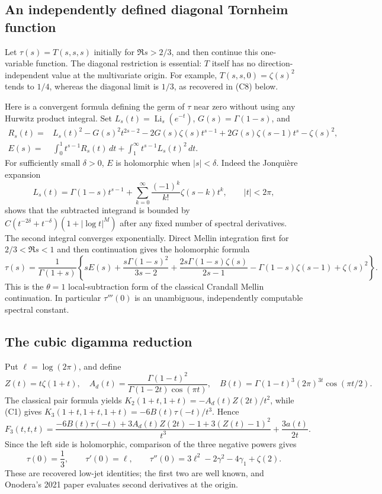 \subsection{An independently defined diagonal Tornheim function}

Let $\tau(s)=T(s,s,s)$ initially for $\Re s>2/3$, and then continue
this one-variable function.  The diagonal restriction is essential:
$T$ itself has no direction-independent value at the multivariate
origin. For example, $T(s,s,0)=\zeta(s)^2$ tends to $1/4$, whereas
the diagonal limit is $1/3$, as recovered in (C8) below.

Here is a convergent formula defining the germ of $\tau$ near zero
without using any Hurwitz product integral. Set
$L_s(t)=\operatorname{Li}_s(e^{-t})$, $G(s)=\Gamma(1-s)$, and
\begin{align*}
 R_s(t)={}&L_s(t)^2-G(s)^2t^{2s-2}
   -2G(s)\zeta(s)t^{s-1}
   +2G(s)\zeta(s-1)t^s-\zeta(s)^2,\\
 E(s)={}&\int_0^1t^{s-1}R_s(t)\,dt
          +\int_1^\infty t^{s-1}L_s(t)^2\,dt.
\end{align*}
For sufficiently small $\delta>0$, $E$ is holomorphic when $|s|<\delta$.
Indeed the Jonqui\`ere expansion \cite{DLMFPolylog}
\[
 L_s(t)=\Gamma(1-s)t^{s-1}
        +\sum_{k=0}^\infty\frac{(-1)^k}{k!}\zeta(s-k)t^k,
 \qquad |t|<2\pi,
\]
shows that the subtracted integrand is bounded by
$C(t^{-2\delta}+t^{-\delta})(1+|\log t|^M)$ after any fixed number
of spectral derivatives. The second integral converges exponentially.
Direct Mellin integration first for $2/3<\Re s<1$ and then continuation
gives the holomorphic formula
\[
 \tau(s)=\frac1{\Gamma(1+s)}\left\{
 sE(s)+\frac{s\Gamma(1-s)^2}{3s-2}
 +\frac{2s\Gamma(1-s)\zeta(s)}{2s-1}
 -\Gamma(1-s)\zeta(s-1)+\zeta(s)^2\right\}. \tag{C6}\label{cub:C6}
\]
This is the $\theta=1$ local-subtraction form of the classical
Crandall Mellin continuation. In particular $\tau'''(0)$ is an
unambiguous, independently computable spectral constant.

\subsection{The cubic digamma reduction}

Put $\ell=\log(2\pi)$, and define
\[
 Z(t)=t\zeta(1+t),\quad
 A_d(t)=\frac{\Gamma(1-t)^2}{\Gamma(1-2t)\cos(\pi t)},\quad
 B(t)=\Gamma(1-t)^3(2\pi)^{3t}\cos(\pi t/2).
\]
The classical pair formula yields
$K_2(1+t,1+t)=-A_d(t)Z(2t)/t^2$, while (C1) gives
$K_3(1+t,1+t,1+t)=-6B(t)\tau(-t)/t^3$. Hence
\[
 F_3(t,t,t)=
 \frac{-6B(t)\tau(-t)+3A_d(t)Z(2t)-1+3(Z(t)-1)^2}{t^3}
 +\frac{3a(t)}{2t}.                           \tag{C7}\label{cub:C7}
\]
Since the left side is holomorphic, comparison of the three negative
powers gives
\[
 \tau(0)=\frac13,\qquad
 \tau'(0)=\ell,\qquad
 \tau''(0)=3\ell^2-2\gamma^2-4\gamma_1+\zeta(2).\tag{C8}\label{cub:C8}
\]
These are recovered low-jet identities; the first two are well known,
and Onodera's 2021 paper evaluates second derivatives at the origin.

